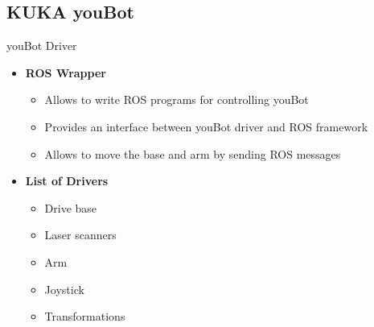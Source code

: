 \subsection{KUKA youBot}
\begin{frame}{youBot Driver}

\begin{itemize}
	\item \textbf{ROS Wrapper}
	\begin{itemize}
		\item Allows to write ROS programs for controlling youBot
		\item Provides an interface between youBot driver and ROS framework
		\item Allows to move the base and arm by sending ROS messages
	\end{itemize}
	\item \textbf{List of Drivers}
		\begin{itemize}
			\item Drive base
			\item Laser scanners
			\item Arm 
			\item Joystick
			\item Transformations
		\end{itemize}
\end{itemize}
  
\end{frame}


